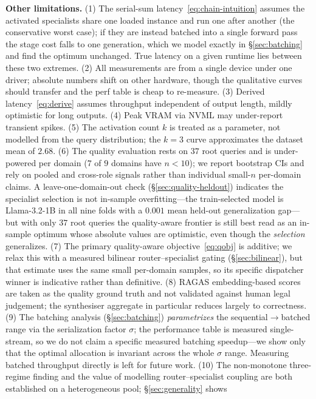 \documentclass[11pt]{article}
\begin{document}
\textbf{Other limitations.} (1) The serial-sum
latency~\eqref{eq:chain-intuition} assumes the activated specialists share one
loaded instance and run one after another (the conservative worst case); if they are
instead batched into a single forward pass the stage cost falls to one generation,
which we model exactly in §\ref{sec:batching} and find the optimum unchanged. True
latency on a given runtime lies between these two extremes. (2) All
measurements are from a single device under one driver; absolute numbers shift on
other hardware, though the qualitative curves should transfer and the perf table
is cheap to re-measure. (3) Derived latency~\eqref{eq:derive} assumes throughput
independent of output length, mildly optimistic for long outputs. (4) Peak VRAM
via NVML may under-report transient spikes. (5) The activation count $k$ is
treated as a parameter, not modelled from the query distribution; the $k{=}3$
curve approximates the dataset mean of $2.68$. (6) The quality evaluation rests on
$37$ root queries and is under-powered per domain ($7$ of $9$ domains have
$n<10$); we report bootstrap CIs and rely on pooled and cross-role signals rather
than individual small-$n$ per-domain claims. A leave-one-domain-out check
(§\ref{sec:quality-heldout}) indicates the specialist selection is not in-sample
overfitting---the train-selected model is Llama-3.2-1B in all nine folds with a
$0.001$ mean held-out generalization gap---but with only $37$ root queries the
quality-aware frontier is still best read as an in-sample optimum whose absolute
values are optimistic, even though the \emph{selection} generalizes. (7) The primary
quality-aware objective~\eqref{eq:qobj} is additive; we relax this with a measured
bilinear router--specialist gating (§\ref{sec:bilinear}), but that estimate uses
the same small per-domain samples, so its specific dispatcher winner is indicative
rather than definitive. (8) RAGAS embedding-based scores are taken
as the quality ground truth and not validated against human legal judgement; the
synthesiser aggregate in particular reduces largely to correctness. (9) The
batching analysis (§\ref{sec:batching}) \emph{parametrizes} the sequential$\to$batched
range via the serialization factor $\sigma$; the performance table is measured
single-stream, so we do not claim a specific measured batching speedup---we show
only that the optimal allocation is invariant across the whole $\sigma$ range.
Measuring batched throughput directly is left for future work. (10) The
non-monotone three-regime finding and the value of modelling router--specialist
coupling are both established on a heterogeneous pool; §\ref{sec:generality} shows
\end{document}
